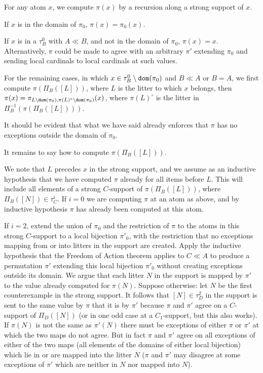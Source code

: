\documentclass[12pt]{article}
\begin{document}
For any atom $x$, we compute $\pi(x)$ by a recursion along a strong support of $x$. 

If $x$ is in the domain of $\pi_0$, $\pi(x) = \pi_0(x)$.

If $x$ is in a $\tau^0_B$ with $A \ll B$, and not in the domain of $\pi_0$, $\pi(x)=x$.  Alternatively, $\pi$ could be made to agree with an arbitrary $\pi'$ extending $\pi_0$ and sending local cardinals to local cardinals at such values.

For the remaining cases, in which $x \in \tau^0_B \setminus {\tt dom}(\pi_0)$ and $B \ll A$ or $B=A$, we first compute $\pi(\Pi_B([L]))$, where $L$ is the litter to which $x$ belongs,
then $\pi(x) = \pi_{L \setminus {\tt dom}(\pi_0),\pi(L)^\circ \setminus {\tt dom}(\pi_0)}(x)$, where $\pi(L)^\circ$ is the litter in $\Pi_B^{-1}(\pi(\Pi_B([L])))$.

It should be evident that what we have said already enforces that $\pi$ has no exceptions outside the domain of $\pi_0$.

It remains to say how to compute $\pi(\Pi_B([L]))$.

We note that $L$ precedes $x$ in the strong support, and we assume as an inductive hypothesis that we have computed $\pi$ already for all items before $L$.
This will include all elements of a strong $C$-support of $\pi(\Pi_B([L]))$, where $\Pi_B([N]) \in \tau^i_C$.  If $i=0$ we are computing $\pi$ at an atom as above, and
by inductive hypothesis $\pi$ has already been computed at this atom.

If $i=2$, extend the union of $\pi_0$ and the restriction of $\pi$ to the atoms in this strong $C$-support to a local bijection $\pi'_0$, with the restriction
that no exceptions mapping from or into litters in the support are created.  Apply the inductive hypothesis that the Freedom of Action theorem applies to $C\ll A$ to produce
a permutation $\pi'$ extending this local bijection $\pi'_0$ without creating exceptions outside its domain.   We argue that each litter $N$ in the support is mapped by $\pi'$ to the value
already computed for $\pi(N)$.  Suppose otherwise:  let $N$ be the first counterexample in the strong support.  It follows that $[N]\in \tau^2_D$ in the support is sent to the same value by $\pi$ that it is by $\pi'$ because $\pi$ and $\pi'$ agree on a $C$-support of $\Pi_D([N])$ (or in one odd case at a $C_1$-support, but this also works).  If $\pi(N)$ is not the same as $\pi'(N)$ there must be exceptions of either $\pi$ or $\pi'$ at which the two maps do not agree.  But in fact $\pi$ and $\pi'$ agree on all exceptions of either of the two maps (all elements of the domains of either local bijection) which lie in or are mapped into the litter $N$ ($\pi$ and $\pi'$ may disagree at some exceptions of $\pi'$ which are neither in $N$ nor mapped into $N$).
\end{document}
